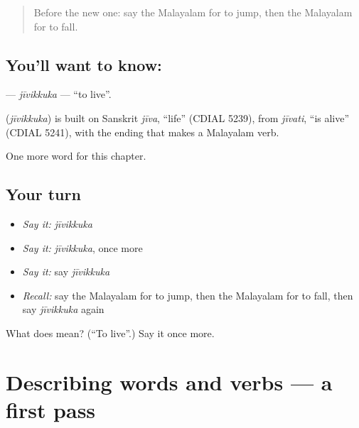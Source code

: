 \label{lesson:ML-C176-jivikkuka}



\begin{quote}
Before the new one: say the Malayalam for to jump, then the Malayalam for to fall.
\end{quote}

\subsection*{You'll want to know: }
\textbf{} — \emph{jīvikkuka} — \textquotedblleft{}to live\textquotedblright{}.

\begin{cousinweb}
\textbf{} (\emph{jīvikkuka}) is built on Sanskrit \emph{jīva}, \textquotedblleft{}life\textquotedblright{} (CDIAL 5239), from \emph{jīvati}, \textquotedblleft{}is alive\textquotedblright{} (CDIAL 5241), with the ending that makes a Malayalam verb.
\end{cousinweb}

\begin{grammarlens}[title={What you've built}]
One more word for this chapter.
\end{grammarlens}

\subsection*{Your turn}
\begin{itemize}
\raggedright
  \item \emph{Say it:} \emph{jīvikkuka}
  \item \emph{Say it:} \emph{jīvikkuka}, once more
  \item \emph{Say it:} say \emph{jīvikkuka}
  \item \emph{Recall:} say the Malayalam for to jump, then the Malayalam for to fall, then say \emph{jīvikkuka} again
\end{itemize}

\begin{tcolorbox}[breakable,colback=teal!4,colframe=teal!35!black,title={Before you move on}]
What does  mean? (\textquotedblleft{}To live\textquotedblright{}.) Say it once more.
\end{tcolorbox}
\section[(dialogue)]{Describing words and verbs — a first pass}

